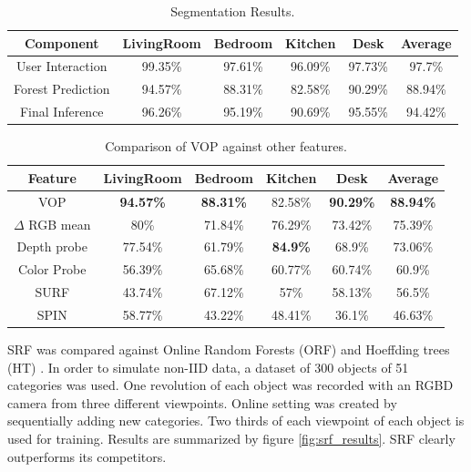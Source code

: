 \documentclass{llncs}
\begin{document}
  
\begin{table}[!ht]	
 \center
 \caption{Segmentation Results.}
 \begin{tabular}{c|c|c|c|c|c}
  \textbf{Component} & \textbf{LivingRoom} & \textbf{Bedroom} & \textbf{Kitchen} & \textbf{Desk} & \textbf{Average} \\ \hline
  User Interaction & 99.35\% & 97.61\% & 96.09\% & 97.73\% & 97.7\% \\ 
  Forest Prediction & 94.57\% & 88.31\% & 82.58\% & 90.29\% & 88.94\% \\
  Final Inference & 96.26\% & 95.19\% & 90.69\% & 95.55\% & 94.42\%
 \end{tabular}
 \label{fig:segm_results}
\end{table}


\begin{table}[!ht]	
 \center
 \caption{Comparison of VOP against other features.}
 \begin{tabular}{c|c|c|c|c|c}
  \textbf{Feature} & \textbf{LivingRoom} & \textbf{Bedroom} & \textbf{Kitchen} & \textbf{Desk} & \textbf{Average} \\ \hline
  VOP & \textbf{94.57\%} & \textbf{88.31\%} & 82.58\% & \textbf{90.29\%} & \textbf{88.94\%} \\
  $\Delta$ RGB mean & 80\% & 71.84\% & 76.29\% & 73.42\% & 75.39\% \\
  Depth probe& 77.54\% & 61.79\% & \textbf{84.9\%} & 68.9\% & 73.06\% \\
  Color Probe& 56.39\% & 65.68\% & 60.77\% & 60.74\% & 60.9\% \\
  SURF & 43.74\% & 67.12\% & 57\% & 58.13\% & 56.5\% \\
  SPIN & 58.77\% & 43.22\% & 48.41\% & 36.1\% & 46.63\% \\
 \end{tabular}
 \label{fig:vop_results}
\end{table}

  SRF was compared against Online Random Forests (ORF) \cite{online_forest} and Hoeffding trees (HT) \cite{htree}. In order to simulate non-IID data, a dataset of 300 objects of 51 categories \cite{dataset} was used. One revolution of each object was recorded with an RGBD camera from three different viewpoints. Online setting was created by sequentially adding new categories. Two thirds of each viewpoint of each object is used for training. Results are summarized by figure \ref{fig:srf_results}. SRF clearly outperforms its competitors.
\end{document}

